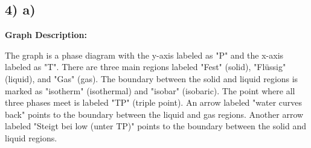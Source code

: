 \subsection*{4) a)}

\begin{center}
\textbf{Graph Description:}
\end{center}

The graph is a phase diagram with the y-axis labeled as "P" and the x-axis labeled as "T". There are three main regions labeled "Fest" (solid), "Flüssig" (liquid), and "Gas" (gas). The boundary between the solid and liquid regions is marked as "isotherm" (isothermal) and "isobar" (isobaric). The point where all three phases meet is labeled "TP" (triple point). An arrow labeled "water curves back" points to the boundary between the liquid and gas regions. Another arrow labeled "Steigt bei low (unter TP)" points to the boundary between the solid and liquid regions.